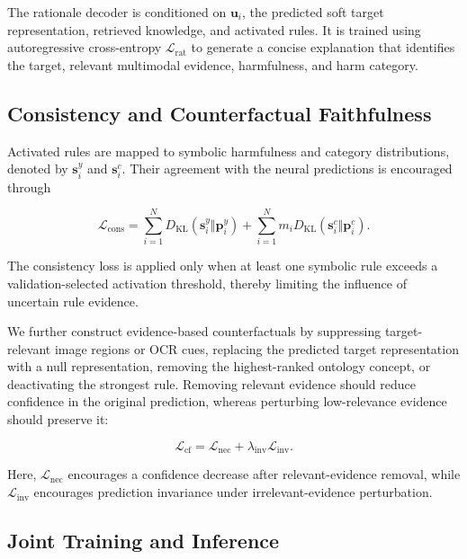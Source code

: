 \documentclass[11pt]{article}
\begin{document}
The rationale decoder is conditioned on $\mathbf{u}_i$, the predicted
soft target representation, retrieved knowledge, and activated rules.
It is trained using autoregressive cross-entropy
$\mathcal{L}_{\mathrm{rat}}$ to generate a concise explanation that
identifies the target, relevant multimodal evidence, harmfulness, and
harm category.

\subsection{Consistency and Counterfactual Faithfulness}
\label{subsec:faithfulness}

Activated rules are mapped to symbolic harmfulness and category
distributions, denoted by $\mathbf{s}^{y}_i$ and
$\mathbf{s}^{c}_i$. Their agreement with the neural predictions is
encouraged through

\begin{equation}
\mathcal{L}_{\mathrm{cons}}
=
\sum_{i=1}^{N}
D_{\mathrm{KL}}
\left(
\mathbf{s}^{y}_i
\Vert
\mathbf{p}^{y}_i
\right)
+
\sum_{i=1}^{N}
m_i
D_{\mathrm{KL}}
\left(
\mathbf{s}^{c}_i
\Vert
\mathbf{p}^{c}_i
\right).
\label{eq:consistency-loss}
\end{equation}

The consistency loss is applied only when at least one symbolic rule
exceeds a validation-selected activation threshold, thereby limiting
the influence of uncertain rule evidence.

We further construct evidence-based counterfactuals by suppressing
target-relevant image regions or OCR cues, replacing the predicted
target representation with a null representation, removing the
highest-ranked ontology concept, or deactivating the strongest rule.
Removing relevant evidence should reduce confidence in the original
prediction, whereas perturbing low-relevance evidence should preserve
it:

\begin{equation}
\mathcal{L}_{\mathrm{cf}}
=
\mathcal{L}_{\mathrm{nec}}
+
\lambda_{\mathrm{inv}}
\mathcal{L}_{\mathrm{inv}}.
\label{eq:counterfactual-loss}
\end{equation}

Here, $\mathcal{L}_{\mathrm{nec}}$ encourages a confidence decrease
after relevant-evidence removal, while
$\mathcal{L}_{\mathrm{inv}}$ encourages prediction invariance under
irrelevant-evidence perturbation.
\subsection{Joint Training and Inference}
\label{subsec:joint-training}
\end{document}
